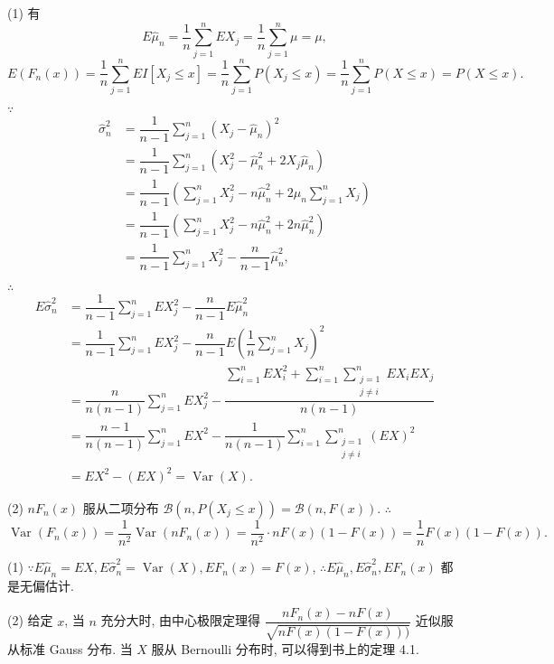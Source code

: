 \documentclass{ctexart}
\begin{document}
\begin{solution}
    (1) 有
    \[E\hat{\mu}_n=\dfrac{1}{n}\sum\limits_{j=1}^nEX_j=\dfrac{1}{n}\sum\limits_{j=1}^n\mu=\mu,\]
    \[E(F_n(x))=\dfrac{1}{n}\sum\limits_{j=1}^nEI[X_j\leq x]=\dfrac{1}{n}\sum\limits_{j=1}^nP(X_j\leq x)=\dfrac{1}{n}\sum\limits_{j=1}^nP(X\leq x)=P(X\leq x).\]

    $\because$
    \begin{align*}
        \hat{\sigma}_n^2 & =\dfrac{1}{n-1}\sum\limits_{j=1}^n(X_j-\hat{\mu}_n)^2 \\
        & =\dfrac{1}{n-1}\sum\limits_{j=1}^n(X_j^2-\hat{\mu}_n^2+2X_j\hat{\mu}_n) \\
        & =\dfrac{1}{n-1}\left(\sum\limits_{j=1}^nX_j^2-n\hat{\mu}_n^2+2\hat{\mu}_n\sum\limits_{j=1}^nX_j\right) \\
        & =\dfrac{1}{n-1}\left(\sum\limits_{j=1}^nX_j^2-n\hat{\mu}_n^2+2n\hat{\mu}_n^2\right) \\
        & =\dfrac{1}{n-1}\sum\limits_{j=1}^nX_j^2-\dfrac{n}{n-1}\hat{\mu}_n^2,
    \end{align*}

    $\therefore$
    \begin{align*}
        E\hat{\sigma}_n^2 & =\dfrac{1}{n-1}\sum\limits_{j=1}^nEX_j^2-\dfrac{n}{n-1}E\hat{\mu}_n^2 \\
        & =\dfrac{1}{n-1}\sum\limits_{j=1}^nEX_j^2-\dfrac{n}{n-1}E\left(\dfrac{1}{n}\sum\limits_{j=1}^nX_j\right)^2 \\
        & =\dfrac{n}{n(n-1)}\sum\limits_{j=1}^nEX_j^2-\dfrac{\sum\limits_{i=1}^nEX_i^2+\sum\limits_{i=1}^n\sum\limits_{\substack{j=1\\j\neq i}}^nEX_iEX_j}{n(n-1)} \\
        & =\dfrac{n-1}{n(n-1)}\sum\limits_{j=1}^nEX^2-\dfrac{1}{n(n-1)}\sum\limits_{i=1}^n\sum\limits_{\substack{j=1\\j\neq i}}^n(EX)^2 \\
        & =EX^2-(EX)^2=\operatorname{Var}(X).
    \end{align*}

    (2) $nF_n(x)$ 服从二项分布 $\mathcal{B}(n,P(X_j\leq x))=\mathcal{B}(n,F(x))$. $\therefore$
    \[\operatorname{Var}(F_n(x))=\dfrac{1}{n^2}\operatorname{Var}(nF_n(x))=\dfrac{1}{n^2}\cdot nF(x)(1-F(x))=\dfrac{1}{n}F(x)(1-F(x)).\]
\end{solution}
\begin{note}
    (1) $\because E\hat{\mu}_n=EX,E\hat{\sigma}_n^2=\operatorname{Var}(X),EF_n(x)=F(x)$, $\therefore E\hat{\mu}_n,E\hat{\sigma}_n^2,EF_n(x)$ 都是无偏估计.

    (2) 给定 $x$, 当 $n$ 充分大时, 由中心极限定理得 $\dfrac{nF_n(x)-nF(x)}{\sqrt{nF(x)(1-F(x)))}}$ 近似服从标准 Gauss 分布. 当 $X$ 服从 Bernoulli 分布时, 可以得到书上的定理 4.1.
\end{note}
\end{document}
